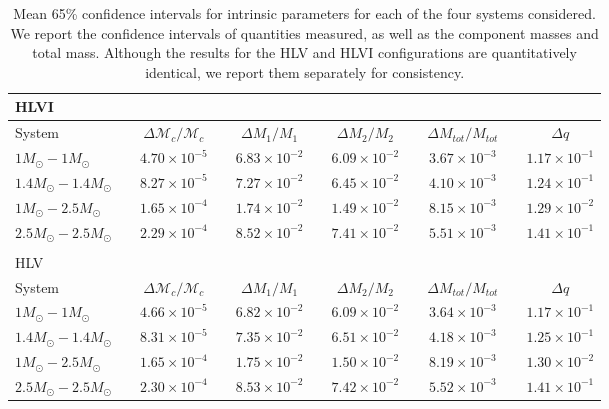 \documentclass[11pt,a4paper]{emulateapj} 
\newcommand{\chmass}{\mathcal{M}_c}
\begin{document}
\begin{table}[t!]
\centering
\caption{Mean 65\% confidence intervals for intrinsic parameters for
  each of the four systems considered.  We report the confidence
  intervals of quantities measured, as well as the component masses
  and total mass.  Although the results for the HLV and HLVI
  configurations are quantitatively identical, we report them
  separately for consistency.}
\begin{tabular}{lcccccccccc}

\\HLVI\\ \hline\hline System & \vline & $\Delta \chmass / \chmass$ &
\vline & $\Delta M_1 / M_1$ & \vline & $\Delta M_2 / M_2$ & \vline &
$\Delta M_{tot}/M_{tot}$ & \vline & $\Delta q$\\ \hline\hline
$1M_{\odot}-1M_{\odot}$ & \vline & $4.70\times 10^{-5}$ & \vline &
$6.83\times 10^{-2}$ & \vline & $6.09\times 10^{-2}$ & \vline &
$3.67\times 10^{-3}$ & \vline & $1.17\times 10^{-1}$\\ \hline
$1.4M_{\odot}-1.4M_{\odot}$ & \vline & $8.27\times 10^{-5}$ & \vline &
$7.27\times 10^{-2}$ & \vline & $6.45\times 10^{-2}$ & \vline &
$4.10\times 10^{-3}$ & \vline & $1.24\times 10^{-1}$ \\ \hline
$1M_{\odot}-2.5M_{\odot}$ & \vline & $1.65\times 10^{-4}$ & \vline &
$1.74\times 10^{-2}$ & \vline & $1.49\times 10^{-2}$ & \vline &
$8.15\times 10^{-3}$ & \vline & $1.29\times 10^{-2}$\\\hline
$2.5M_{\odot}-2.5M_{\odot}$ & \vline & $2.29\times 10^{-4}$ & \vline &
$8.52\times 10^{-2}$ & \vline & $7.41\times 10^{-2}$ & \vline &
$5.51\times 10^{-3}$ & \vline & $1.41\times 10^{-1}$\\ \hline\hline

\\ HLV\\

\hline\hline System & \vline & $\Delta \chmass / \chmass$ & \vline &
$\Delta M_1 / M_1$ & \vline & $\Delta M_2 / M_2$ & \vline & $\Delta
M_{tot}/M_{tot}$ & \vline & $\Delta q$\\ \hline\hline
$1M_{\odot}-1M_{\odot}$ & \vline & $4.66\times 10^{-5}$ & \vline &
$6.82\times 10^{-2}$ & \vline & $6.09\times 10^{-2}$ & \vline &
$3.64\times 10^{-3}$ & \vline & $1.17\times 10^{-1}$ \\ \hline
$1.4M_{\odot}-1.4M_{\odot}$ & \vline & $8.31\times 10^{-5}$ & \vline &
$7.35\times 10^{-2}$ & \vline & $6.51\times 10^{-2}$ & \vline &
$4.18\times 10^{-3}$ & \vline & $1.25\times 10^{-1}$\\ \hline
$1M_{\odot}-2.5M_{\odot}$ & \vline & $1.65\times 10^{-4}$ & \vline &
$1.75\times 10^{-2}$ & \vline & $1.50\times 10^{-2}$ & \vline &
$8.19\times 10^{-3}$ & \vline & $1.30\times 10^{-2}$ \\ \hline
$2.5M_{\odot}-2.5M_{\odot}$ & \vline & $2.30\times 10^{-4}$ & \vline &
$8.53\times 10^{-2}$ & \vline & $7.42\times 10^{-2}$ & \vline &
$5.52\times 10^{-3}$ & \vline & $1.41\times 10^{-1}$ \\ \hline\hline


\end{tabular}
\label{ciTableIntrinsic}
\end{table}
\end{document}
